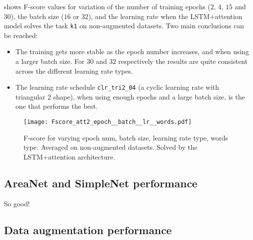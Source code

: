 
 shows F-score values for 
variation of 
the number of training epochs ($2$, $4$, $15$ and $30$),
the batch size ($16$ or $32$),
and the learning rate
when the LSTM+attention model solves the task \texttt{k1}
on non-augmented datasets.
Two main conclusions can be reached:
\begin{itemize}
    \item
        The training gets more stable as the epoch number increases, and when
        using a larger batch size. For $30$ and $32$ respectively the results
        are quite consistent across the different learning rate types.
    \item
        The learning rate schedule \texttt{clr\_tri2\_04} (a cyclic learning
        rate with triangular 2 shape), when using enough epochs and a large
        batch size, is the one that performs the best.
\end{itemize}

\begin{figure*}[t!]
    \centering
    \texttt{[image: Fscore\_att2\_epoch\_\_batch\_\_lr\_\_words.pdf]}
    \caption{F-score for varying
        epoch num,
        batch size,
        learning rate type,
        words type.
        Averaged on non-augmented datasets.
        Solved by the LSTM+attention architecture.
        }%
    \label{fig:att_epoch_batch_lr_words}
\end{figure*}

\subsection{AreaNet and SimpleNet performance}

So good!

\subsection{Data augmentation performance}


